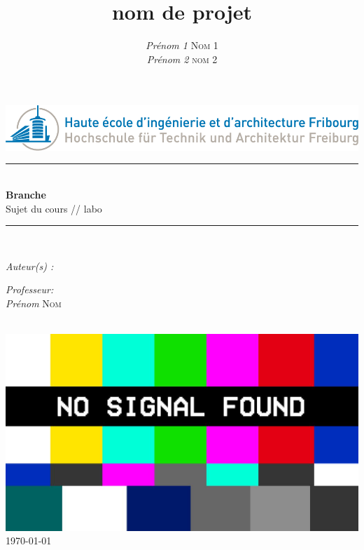 

\title{nom de projet} 
\author{\textsl{Prénom 1} \textsc{Nom 1}\\
\textsl{Prénom 2} \textsc{nom 2}}
\date{} 


    \begin{titlepage}
        \begin{center}
            \includegraphics[scale=.4]{Img/heia-fr-logo.png}\\[1.3cm]
            
            \rule{\linewidth}{0.3mm} \\[0.3cm]
            {\huge \bfseries Branche\\[0.5cm]} 
            {\Large  Sujet du cours // labo }
            \rule{\linewidth}{0.3mm} \\[0.8cm]
            \noindent
            \begin{minipage}[t]{0.4\textwidth}
                \begin{flushleft} \large
                    \emph{Auteur(s) :}\\
                    \theauthor
                \end{flushleft}
            \end{minipage}
            \begin{minipage}[t]{0.4\textwidth} 
                \begin{flushright} \large
                    \emph{Professeur:}\\
                    \textsl{Prénom} \textsc{Nom}\\ 
                \end{flushright} 
                \vfill
            \end{minipage}\\[1.3cm]
            \includegraphics[scale=0.6]{Img/1.JPG}\\[1.5cm]
            \vspace*{1\baselineskip}
            \today \\[0.7cm]
        \end{center}
    \end{titlepage}
